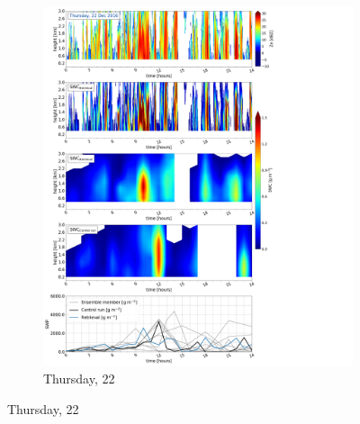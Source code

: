 \begin{figure}\ContinuedFloat
   	\centering
	\begin{subfigure}[b]{0.8\textwidth}
			\includegraphics[trim={0.5cm 0.5cm 17.5cm .5cm},clip,width=\textwidth]{./fig_SWC/20161222}
			\caption{Thursday, \SI{22}{\dec}}\label{fig:SWC22}
		\end{subfigure}
	\end{figure}
